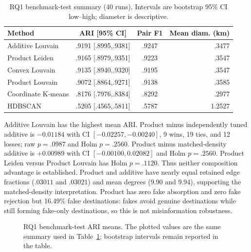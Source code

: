 \documentclass[runningheads]{llncs}
\begin{document}
\begin{table}[t]
\centering\scriptsize
\caption{RQ1 benchmark-test summary (40 runs). Intervals are bootstrap 95\%
CI low--high; diameter is descriptive.}
\label{tab:clustering-results}
\begin{tabular}{lccr}
\toprule
Method & ARI [95\% CI] & Pair F1 & Mean diam. (km)\\
\midrule
Additive Louvain & .9191 [.8995,.9381] & .9247 & .3477\\
Product Leiden & .9165 [.8979,.9351] & .9223 & .3547\\
Convex Louvain & .9135 [.8940,.9320] & .9195 & .3547\\
Product Louvain & .9072 [.8864,.9271] & .9138 & .3585\\
Coordinate K-means & .8176 [.7976,.8384] & .8292 & .2977\\
HDBSCAN & .5205 [.4565,.5811] & .5787 & 1.2527\\
\bottomrule
\end{tabular}
\end{table}

Additive Louvain has the highest mean ARI. Product minus independently tuned
additive is $-0.01184$ with CI $[-0.02257,-0.00240]$, 9 wins, 19 ties, and
12 losses; raw $p=.0987$ and Holm $p=.2560$. Product minus matched-density
additive is $+0.00989$ with CI $[-0.00100,0.02082]$ and Holm $p=.2560$.
Product Leiden versus Product Louvain has Holm $p=.1120$. Thus neither
composition advantage is established. Product and additive have nearly equal
retained edge fractions ($.03011$ and $.03021$) and mean degrees (9.90 and
9.94), supporting the matched-density interpretation. Product has zero fake
absorption and zero fake rejection but 16.49\% false destinations: fakes avoid
genuine destinations while still forming fake-only destinations, so this is
not misinformation robustness.

\begin{figure}[t]
\centering
{}
\caption{RQ1 benchmark-test ARI means. The plotted values are the same summary
used in Table~\ref{tab:clustering-results}; bootstrap intervals remain reported
in the table.}
\label{fig:rq1-ari}
\end{figure}
\end{document}
